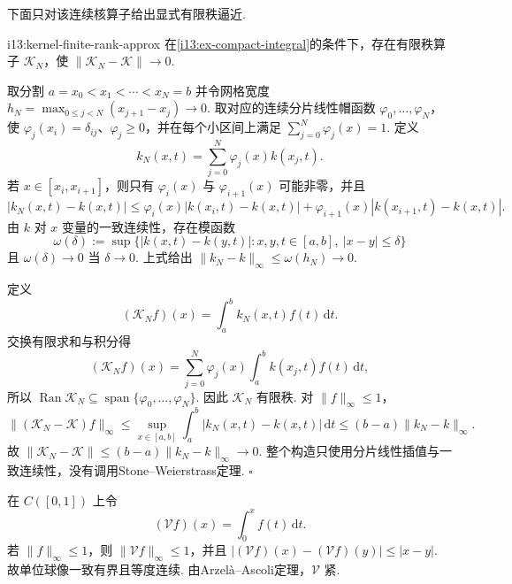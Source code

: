 下面只对该连续核算子给出显式有限秩逼近.

\begin{FAProposition}[B][连续核算子的显式有限秩逼近]{i13:kernel-finite-rank-approx}
在\autoref{i13:ex-compact-integral}的条件下，存在有限秩算子 \(\displaystyle \mathcal K_N\)，使 \(\displaystyle \|\mathcal K_N-\mathcal K\|\to0\).
\end{FAProposition}

\begin{FAProof}
取分割
\(\displaystyle a=x_0<x_1<\cdots<x_N=b\)
并令网格宽度 \(\displaystyle h_N=\max_{0\leqslant j<N}(x_{j+1}-x_j)\to0\). 取对应的连续分片线性帽函数 \(\displaystyle \varphi_0,\dots,\varphi_N\)，使 \(\displaystyle \varphi_j(x_i)=\delta_{ij}\)、\(\displaystyle \varphi_j\geqslant0\)，并在每个小区间上满足 \(\displaystyle \sum_{j=0}^N\varphi_j(x)=1\). 定义
\[
k_N(x,t)
=
\sum_{j=0}^N\varphi_j(x)k(x_j,t).
\]
若 \(\displaystyle x\in[x_i,x_{i+1}]\)，则只有 \(\displaystyle \varphi_i(x)\) 与 \(\displaystyle \varphi_{i+1}(x)\) 可能非零，并且
\[
|k_N(x,t)-k(x,t)| \leqslant \varphi_i(x)|k(x_i,t)-k(x,t)| \mathrel{+} \varphi_{i+1}(x)|k(x_{i+1},t)-k(x,t)|.
\]
由 \(\displaystyle k\) 对 \(\displaystyle x\) 变量的一致连续性，存在模函数
\[
\omega(\delta)
:=
\sup\{|k(x,t)-k(y,t)|:x,y,t\in[a,b],\ |x-y|\leqslant\delta\}
\]
且 \(\displaystyle \omega(\delta)\to0\) 当 \(\displaystyle \delta\to0\). 上式给出 \(\displaystyle \|k_N-k\|_\infty\leqslant\omega(h_N)\to0\).

定义
\[
(\mathcal K_Nf)(x)
=
\int_a^b k_N(x,t)f(t)\,\mathrm{d}t.
\]
交换有限求和与积分得
\[
(\mathcal K_Nf)(x)
=
\sum_{j=0}^N
\varphi_j(x)
\int_a^b k(x_j,t)f(t)\,\mathrm{d}t,
\]
所以
\(\displaystyle \operatorname{Ran}\mathcal K_N \subseteq \operatorname{span}\{\varphi_0,\dots,\varphi_N\}\).
因此 \(\displaystyle \mathcal K_N\) 有限秩. 对 \(\displaystyle \|f\|_\infty\leqslant1\)，
\[
\|(\mathcal K_N-\mathcal K)f\|_\infty \leqslant \sup_{x\in[a,b]} \int_a^b|k_N(x,t)-k(x,t)|\,\mathrm{d}t \leqslant (b-a)\|k_N-k\|_\infty.
\]
故
\(\displaystyle \|\mathcal K_N-\mathcal K\| \leqslant (b-a)\|k_N-k\|_\infty \to0\).
整个构造只使用分片线性插值与一致连续性，没有调用Stone--Weierstrass定理.
\hfill\(\square\)
\end{FAProof}

\begin{FAExample}[Volterra算子的紧性]\label{i13:ex-volterra-compact}
在 \(\displaystyle C([0,1])\) 上令
\[
(\mathcal Vf)(x)
=
\int_0^x f(t)\,\mathrm{d}t.
\]
若 \(\displaystyle \|f\|_\infty\leqslant1\)，则 \(\displaystyle \|\mathcal Vf\|_\infty\leqslant1\)，并且
\(\displaystyle |(\mathcal Vf)(x)-(\mathcal Vf)(y)| \leqslant |x-y|\).
故单位球像一致有界且等度连续. 由Arzelà--Ascoli定理，\(\displaystyle \mathcal V\) 紧.
\end{FAExample}

